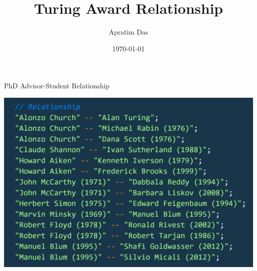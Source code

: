 \documentclass[11pt,aspectratio=169]{beamer}
\author{Apratim Das}
\title{Turing Award Relationship}
\institute{UNBC}
\date{\today}
\begin{document}
\begin{frame}
	\titlepage%
\end{frame}



\begin{frame}{PhD Advisor-Student Relationship}
    \begin{center}
        \includegraphics[scale = 0.63]{relbasic.png}
    \end{center}
    \end{frame}
    
\end{document}

